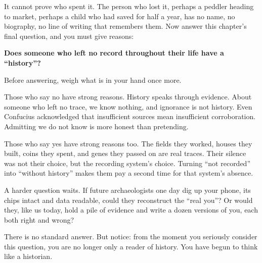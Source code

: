 It cannot prove who spent it. The person who lost it, perhaps a peddler heading to market, perhaps a child who had saved for half a year, has no name, no biography, no line of writing that remembers them. Now answer this chapter's final question, and you must give reasons:

\textbf{Does someone who left no record throughout their life have a ``history''?}

Before answering, weigh what is in your hand once more.

Those who say no have strong reasons. History speaks through evidence. About someone who left no trace, we know nothing, and ignorance is not history. Even Confucius acknowledged that insufficient sources mean insufficient corroboration. Admitting we do not know is more honest than pretending.

Those who say yes have strong reasons too. The fields they worked, houses they built, coins they spent, and genes they passed on are real traces. Their silence was not their choice, but the recording system's choice. Turning ``not recorded'' into ``without history'' makes them pay a second time for that system's absence.

A harder question waits. If future archaeologists one day dig up your phone, its chips intact and data readable, could they reconstruct the ``real you''? Or would they, like us today, hold a pile of evidence and write a dozen versions of you, each both right and wrong?

There is no standard answer. But notice: from the moment you seriously consider this question, you are no longer only a reader of history. You have begun to think like a historian.
